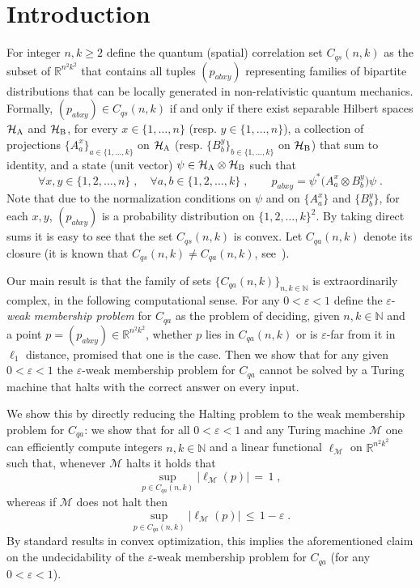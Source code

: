 \documentclass[11pt]{article}
\theoremstyle{definition}
\newcommand{\N}{\ensuremath{\mathbb{N}}}
\newcommand{\R}{\ensuremath{\mathbb{R}}}
\newcommand{\mH}{\ensuremath{\mathcal{H}}}
\newcommand{\cM}{\ensuremath{\mathcal{M}}}
\newcommand{\eps}{\varepsilon}
\newcommand{\labelstyle}[1]{\ensuremath{\textsc{#1}}\xspace}
\newcommand{\alice}{\labelstyle{A}}
\newcommand{\bob}{\labelstyle{B}}
\begin{document}
\section{Introduction}
\label{sec:intro}

For integer $n,k\geq 2$ define the quantum (spatial) correlation set $C_{qs}(n,k)$ as the subset of $\R^{n^2k^2}$ that contains all tuples $(p_{abxy})$ representing families of bipartite distributions that can be locally generated in non-relativistic quantum mechanics. Formally, $(p_{abxy}) \in C_{qs}(n,k)$ if and only if there exist separable Hilbert spaces $\mH_\alice$ and $\mH_\bob$, for every $x\in\{1,\ldots,n\}$ (resp. $y\in\{1,\ldots,n\}$), a collection of projections $\{A^x_a\}_{a\in\{1,\ldots,k\}}$ on $\mH_\alice$ (resp. $\{B^y_b\}_{b\in\{1,\ldots,k\}}$ on $\mH_\bob$) that sum to identity, and a state (unit vector) $\psi \in \mH_\alice \otimes \mH_\bob$ such that 
\begin{equation}\label{eq:intro-qs}
  \forall x,y\in \{1, 2, \ldots, n\}\;,\quad\forall a,b\in\{1, 2, \ldots, k\}\;,
  \qquad p_{abxy} = \psi^* \big( A^x_a \otimes B^y_b\big) \psi\;.
\end{equation}
Note that due to the normalization conditions on $\psi$ and on $\{A^x_a\}$ and
$\{B^y_b\}$, for each $x,y$, $(p_{abxy})$ is a probability distribution on
$\{1, 2, \ldots, k\}^2$.
By taking direct sums it is easy to see that the set $C_{qs}(n,k)$ is convex. Let $C_{qa}(n,k)$ denote its closure (it is known that $C_{qs}(n,k) \neq C_{qa}(n,k)$, see~\cite{slofstra2019set}).

Our main result is that the family of sets $\{C_{qa}(n,k)\}_{n,k \in \N}$ is extraordinarily complex, in the following computational sense. For any $0<\eps<1$ define the $\eps$-\emph{weak membership problem} for $C_{qa}$ as the problem of deciding, given $n,k \in \N$ and a point $p=(p_{abxy}) \in \R^{n^2 k^2}$, whether $p$ lies in $C_{qa}(n,k)$ or is $\eps$-far from it in $\ell_1$ distance, promised that one is the case. Then we show that for any given $0<\eps<1$ the  $\eps$-{weak membership problem} for $C_{qa}$ cannot be solved by a Turing machine that halts with the correct answer on every input.

We show this by directly reducing the Halting problem to the weak membership problem for $C_{qa}$: we show that for all $0 < \eps < 1$ and any Turing machine $\cM$ one can efficiently compute integers $n,k\in \N$ and a linear functional $\ell_\cM$ on $\R^{n^2k^2}$ such that, whenever $\cM$ halts it holds that 
\begin{equation}\label{eq:intro-win-1}
\sup_{p\in C_{qa}(n,k)} \big|\ell_\cM(p)\big| \,=\,1\;,
\end{equation}
 whereas if $\cM$ does not halt then 
\begin{equation}\label{eq:intro-win-2}
\sup_{p\in C_{qa}(n,k)} \big|\ell_\cM(p)\big| \,\leq\, 1 - \eps\;.
\end{equation}
By standard results in convex optimization, this implies the aforementioned claim on the undecidability of the $\eps$-weak membership problem for $C_{qa}$ (for any $0<\eps<1$). 
\end{document}
